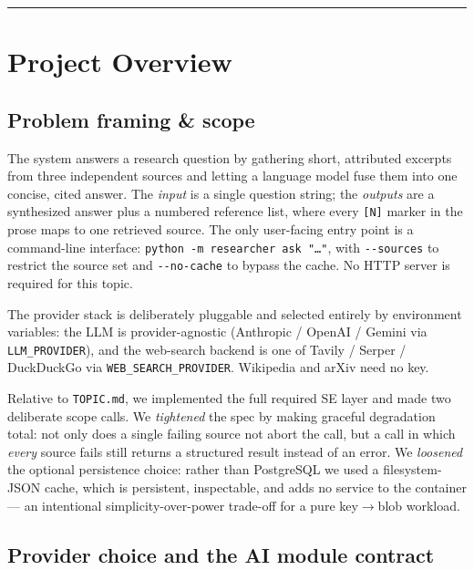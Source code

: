 \documentclass[11pt,a4paper]{article}
\begin{document}
\tableofcontents
\vspace{0.6em}\hrule\vspace{0.4em}

\section{Project Overview}

\subsection{Problem framing \& scope}

The system answers a research question by gathering short, attributed excerpts from three
independent sources and letting a language model fuse them into one concise, cited answer.
The \emph{input} is a single question string; the \emph{outputs} are a synthesized answer
plus a numbered reference list, where every \texttt{[N]} marker in the prose maps to one
retrieved source. The only user-facing entry point is a command-line interface:
\texttt{python -m researcher ask "\dots"}, with \texttt{-{}-sources} to restrict the source
set and \texttt{-{}-no-cache} to bypass the cache. No HTTP server is required for this topic.

The provider stack is deliberately pluggable and selected entirely by environment variables:
the LLM is provider-agnostic (Anthropic / OpenAI / Gemini via \texttt{LLM\_PROVIDER}), and the
web-search backend is one of Tavily / Serper / DuckDuckGo via \texttt{WEB\_SEARCH\_PROVIDER}.
Wikipedia and arXiv need no key.

Relative to \texttt{TOPIC.md}, we implemented the full required SE layer and made two
deliberate scope calls. We \emph{tightened} the spec by making graceful degradation total:
not only does a single failing source not abort the call, but a call in which \emph{every}
source fails still returns a structured result instead of an error. We \emph{loosened} the
optional persistence choice: rather than PostgreSQL we used a filesystem-JSON cache, which is
persistent, inspectable, and adds no service to the container --- an intentional
simplicity-over-power trade-off for a pure key$\rightarrow$blob workload.

\subsection{Provider choice and the AI module contract}
\end{document}
